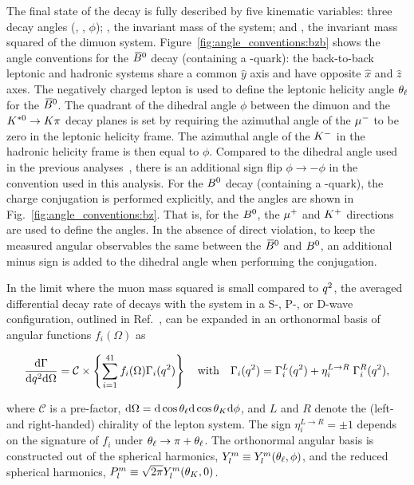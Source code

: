 The final state of the decay \BdToKpimm is fully described by five kinematic variables: three decay angles (\thetal, \thetak, $\phi$); \mkpi, the invariant mass of the \Kp\pim system; and \qsq, the invariant mass squared of the dimuon system. 
Figure~\ref{fig:angle_conventions:bzb} shows the angle conventions for the ${{\kern 0.18em\overline{\kern -0.18em B}{}}{}^0}$ decay (containing a \bquark-quark): the back-to-back leptonic and hadronic systems share a common $\hat{y}$ axis and have opposite $\hat{x}$ and $\hat{z}$ axes. 
The negatively charged lepton is used to define the leptonic helicity angle $\theta_\ell$ for the ${{\kern 0.18em\overline{\kern -0.18em B}{}}{}^0}$.
The quadrant of the dihedral angle $\phi$ between the dimuon and the ${{K}^{*0}} \rightarrow K\pi$ decay planes is set by requiring the azimuthal angle of the ${\mu^-}$ to be zero in the leptonic helicity frame. The azimuthal angle of the ${{K}^-}$ in the hadronic helicity frame is then equal to $\phi$. Compared to the dihedral angle used in the previous \lhcb analyses~\cite{kstmm-0.3fb,kstmm-1fb,kstmm-1fb-pprime,kstmm-3fb}, there is an additional sign flip $\phi \to -\phi$ in the convention used in this analysis. For the ${{B}^0}$ decay (containing a \bquarkbar-quark), the charge conjugation is performed explicitly, and the angles are shown in Fig.~\ref{fig:angle_conventions:bz}. That is, for the ${{B}^0}$, the ${\mu^+}$ and ${{K}^+}$ directions are used to define the angles. In the absence of direct \CP violation, to keep the measured angular observables the same between the ${{\kern 0.18em\overline{\kern -0.18em B}{}}{}^0}$ and ${{B}^0}$, an additional minus sign is added to the dihedral angle when performing the \CP conjugation.

In the limit where the muon mass squared is small compared to ${q^2}$, the \CP averaged differential decay rate of \BdToKpimm decays with the \Kp\pim system in a S-, P-, or D-wave configuration, outlined in Ref.~\cite{biplab}, can be expanded in an orthonormal basis of angular functions $f_i(\Omega)$ as

\begin{equation}
\label{eqn:vector_moments}
\frac{\mathrm{d}\Gamma }{\mathrm{d}{q^2} \mathrm{d}\Omega} = \mathcal{C} \times \left\{ \displaystyle \sum^{41}_{i=1} f_i (\Omega) \Gamma_i({q^2}) \right\} 
 \quad\mbox{with}\quad
\Gamma_i({q^2}) = \Gamma^L_i({q^2}) + \eta^{L\rightarrow R}_i\; \Gamma^R_i({q^2}),
\end{equation}

\noindent where $\mathcal{C}$ is a pre-factor, $\mathrm{d}\Omega = \mathrm{d}\cos{\theta_\ell} \mathrm{d}\cos{\theta_K} \mathrm{d}\phi$, and $L$ and $R$ denote the (left- and right-handed) chirality of the lepton system. The sign $\eta^{L\to R}_i=\pm 1$ depends on the signature of $f_i$ under $\theta_\ell \rightarrow \pi + \theta_\ell$. 
\noindent The orthonormal angular basis is constructed out of the spherical harmonics, \mbox{$Y^m_l \equiv Y^m_l (\theta_\ell,\phi)$}, and the reduced spherical harmonics, \mbox{${P^m_l \equiv \sqrt{2 \pi}Y^m_l(\theta_K,0)}$}.
 
